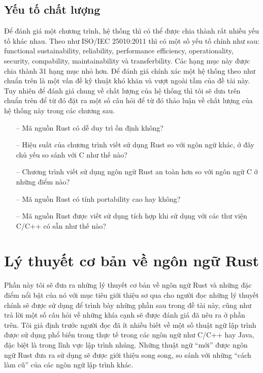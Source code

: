\subsection{Yếu tố chất lượng}\label{lbl:quality_iso}
Để đánh giá một chương trình, hệ thống thì có thể được chia thành rất nhiều yếu tố khác nhau.
Theo như ISO/IEC 25010:2011 thì có một số yếu tố chính như sau: functional sustainability, reliability, performance efficiency, operationality, security, compability, maintainability và transferbility. Các hạng mục này được chia thành 31 hạng mục nhỏ hơn.
Để đánh giá chính xác một hệ thống theo như chuẩn trên là một vấn đề kỹ thuật khó khăn và vượt ngoài tầm của đề tài này.
Tuy nhiên để đánh giá chung về chất lượng của hệ thống thì tôi sẽ dưa trên chuẩn trên để từ đó đặt ra một số câu hỏi để từ đó thảo luận về chất lượng của hệ thống này trong các chương sau.
\begin{itemize}
    \item[--] Mã nguồn Rust có dễ duy trì ồn định không?
    \item[--] Hiệu suất của chương trình viết sử dụng Rust so với ngôn ngữ khác, ở đây chủ yếu so sánh với C như thế nào?
    \item[--] Chương trình viết sử dụng ngôn ngữ Rust an toàn hơn so với ngôn ngữ C ở những điểm nào?
    \item[--] Mã nguồn Rust có tính portability cao hay không?
    \item[--] Mã nguồn Rust được viết sử dụng tích hợp khi sử dụng với các thư viện C/C++ có sẵn như thế nào?
\end{itemize}

\section{Lý thuyết cơ bản về ngôn ngữ Rust}
Phần này tôi sẽ đưa ra những lý thuyết cơ bản về ngôn ngữ Rust và những đặc điểm nổi bật của nó với mục tiêu giới thiệu sơ qua cho người đọc những lý thuyết chính sẽ được sử dụng để trình bày những phần sau trong đề tài này, cũng như trả lời một số câu hỏi về những khía cạnh sẽ được đánh giá đã nêu ra ở phần trên.
Tôi giả định trước người đọc đã ít nhiều biết về một số thuật ngữ lập trình được sử dụng phổ biến trong thực tế trong các ngôn ngữ như C/C++ hay Java, đặc biệt là trong lĩnh vực lập trình nhúng.
Những thuật ngữ ``mới'' được ngôn ngữ Rust đưa ra sử dụng sẽ được giới thiệu song song, so sánh với những ``cách làm cũ'' của các ngôn ngữ lập trình khác.

